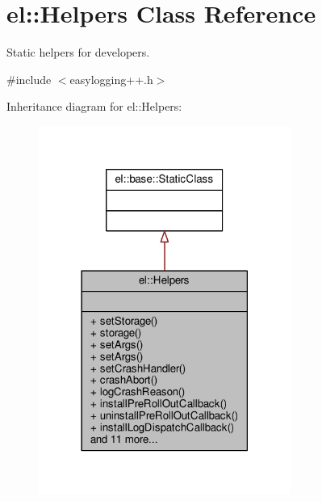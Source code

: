 \hypertarget{classel_1_1Helpers}{}\section{el\+:\+:Helpers Class Reference}
\label{classel_1_1Helpers}


Static helpers for developers.  




{\ttfamily \#include $<$easylogging++.\+h$>$}



Inheritance diagram for el\+:\+:Helpers\+:
\nopagebreak
\begin{figure}[H]
\begin{center}
\leavevmode
\includegraphics[width=234pt]{d4/deb/classel_1_1Helpers__inherit__graph}
\end{center}
\end{figure}


